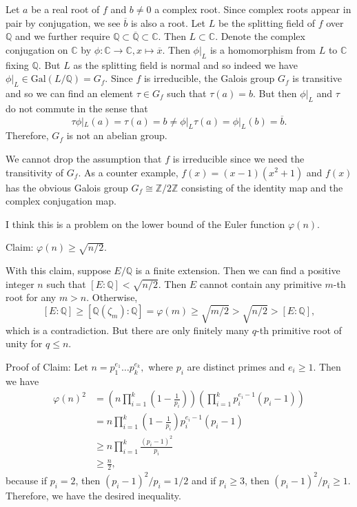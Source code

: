 \documentclass[12pt,reqno]{article}
\theoremstyle{definition}
\newcommand{\gal}{\mbox{Gal}}
\newcommand{\cc}{\mathbb{C}}
\newcommand{\qq}{\mathbb{Q}}
\newcommand{\zz}{\mathbb{Z}}
\begin{document}
\begin{solution}{3}
	Let $a$ be a real root of $f$ and $b\not=0$ a complex root. Since complex roots appear in pair by conjugation, we see $\overline{b}$ is also a root. Let $L$ be the splitting field of $f$ over $\qq$ and we further require $\qq\subset\overline{\qq}\subset \cc$. Then $L\subset \cc$. Denote the complex conjugation on $\cc$ by $\phi: \cc\to \cc, x\mapsto \overline{x}$. Then $\phi|_L$ is a homomorphism from $L$ to $\cc$ fixing $\qq$. But $L$ as the splitting field is normal and so indeed we have $\phi|_L\in \gal(L/\qq)=G_f$. Since $f$ is irreducible, the Galois group $G_f$ is transitive and so we can find an element $\tau\in G_f$ such that $\tau(a)=b$. But then $\phi|_L$ and $\tau$ do not commute in the sense that $$\tau\phi|_L(a)=\tau(a)=b\not= \phi|_L\tau(a)=\phi|_L(b)=\overline{b}.$$ Therefore, $G_f$ is not an abelian group.

	We cannot drop the assumption that $f$ is irreducible since we need the transitivity of $G_f$. As a counter example, $f(x)=(x-1)(x^2+1)$ and $f(x)$ has the obvious Galois group $G_f\cong \zz/2\zz$ consisting of the identity map and the complex conjugation map.
\end{solution}

\begin{solution}{4}
	I think this is a problem on the lower bound of the Euler function $\varphi(n)$.

	Claim: $\varphi(n)\geq \sqrt{n/2}$.


	With this claim, suppose $E/\qq$ is a finite extension. Then we can find a positive integer $n$ such that $[E:\qq] <\sqrt{n/2}$. Then $E$ cannot contain any primitive $m$-th root for any $m>n$. Otherwise, $$[E:\qq] \geq [\qq(\zeta_m):\qq]=\varphi(m) \geq \sqrt{m/2} >\sqrt{n/2} > [E:\qq],$$ which is a contradiction. But there are only finitely many $q$-th primitive root of unity for $q\leq n$.


	Proof of Claim: Let $n=p_1^{e_1}\dots p_k^{e_k},$ where $p_i$ are distinct primes and $e_i\geq 1$. Then we have
	\begin{align*}
		\varphi(n)^2 & =  (n \prod_{i=1}^k(1-\frac{1}{p_i}))(\prod_{i=1}^k p_i^{e_i-1}(p_i-1)) \\
		             & = n \prod_{i=1}^{k} (1-\frac{1}{p_i})p_i^{e_i-1}(p_i-1)                 \\
		             & \geq n \prod_{i=1}^k \frac{(p_i-1)^2}{p_i}                              \\
		             & \geq \frac{n}{2},
	\end{align*}
	because if $p_i=2$, then ${(p_i-1)^2}/{p_i}= 1/2$ and if $p_i\geq 3$, then ${(p_i-1)^2}/{p_i}\geq 1$.
	Therefore, we have the desired inequality.
\end{solution}
\end{document}
